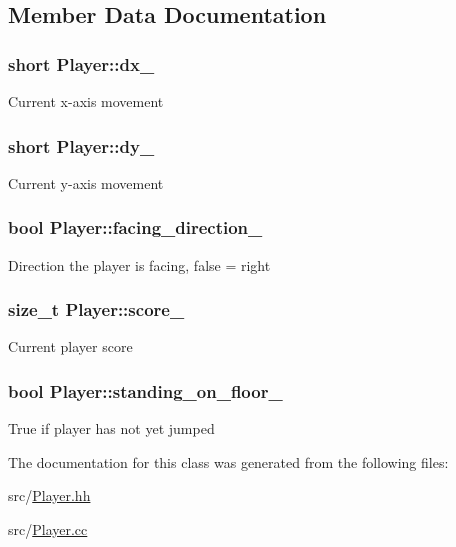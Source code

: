 \subsection{Member Data Documentation}
\hypertarget{classPlayer_a24f9dd9a89dc11513ed416dfaa27743b}{
\subsubsection[{dx\-\_\-}]{\setlength{\rightskip}{0pt plus 5cm}short Player\-::dx\-\_\-\hspace{0.3cm}{\ttfamily [private]}}}\label{classPlayer_a24f9dd9a89dc11513ed416dfaa27743b}
Current x-\/axis movement \hypertarget{classPlayer_a744cf17a4642fef56b8fe34abdfe9b74}{
\subsubsection[{dy\-\_\-}]{\setlength{\rightskip}{0pt plus 5cm}short Player\-::dy\-\_\-\hspace{0.3cm}{\ttfamily [private]}}}\label{classPlayer_a744cf17a4642fef56b8fe34abdfe9b74}
Current y-\/axis movement \hypertarget{classPlayer_a5d2d7cc1c18dc8863fbdbf9184c43b30}{
\subsubsection[{facing\-\_\-direction\-\_\-}]{\setlength{\rightskip}{0pt plus 5cm}bool Player\-::facing\-\_\-direction\-\_\-\hspace{0.3cm}{\ttfamily [private]}}}\label{classPlayer_a5d2d7cc1c18dc8863fbdbf9184c43b30}
Direction the player is facing, false = right \hypertarget{classPlayer_a886bb5b698fe05279fc3b2b40be11730}{
\subsubsection[{score\-\_\-}]{\setlength{\rightskip}{0pt plus 5cm}size\-\_\-t Player\-::score\-\_\-\hspace{0.3cm}{\ttfamily [private]}}}\label{classPlayer_a886bb5b698fe05279fc3b2b40be11730}
Current player score \hypertarget{classPlayer_af64bce8749b5148e518390dea7387ce7}{
\subsubsection[{standing\-\_\-on\-\_\-floor\-\_\-}]{\setlength{\rightskip}{0pt plus 5cm}bool Player\-::standing\-\_\-on\-\_\-floor\-\_\-\hspace{0.3cm}{\ttfamily [private]}}}\label{classPlayer_af64bce8749b5148e518390dea7387ce7}
True if player has not yet jumped 

The documentation for this class was generated from the following files\-:\begin{DoxyCompactItemize}
\item 
src/\hyperlink{Player_8hh}{Player.\-hh}\item 
src/\hyperlink{Player_8cc}{Player.\-cc}\end{DoxyCompactItemize}
